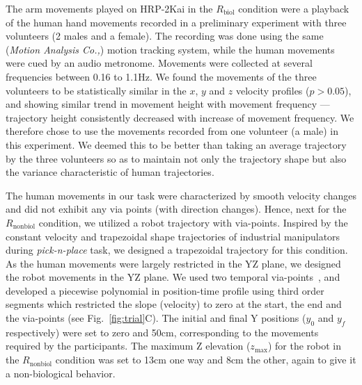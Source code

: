 The arm movements played on HRP-2Kai in the $R_{\text{biol}}$ condition were a playback of the human hand movements recorded in a preliminary experiment with three volunteers (2 males and a female). The recording was done using the same ({\it Motion Analysis Co.,}) motion tracking system, while the human movements were cued by an audio metronome. Movements were collected at several frequencies between 0.16 to 1.1Hz. We found the movements of the three volunteers to be statistically similar in the $x$, $y$ and $z$ velocity profiles ($p > 0.05$), and showing similar trend in movement height with movement frequency ---trajectory height consistently decreased with increase of movement frequency. We therefore chose to use the movements recorded from one volunteer (a male) in this experiment. We deemed this to be better than taking an average trajectory by the three volunteers so as to maintain not only the trajectory shape but also the variance characteristic of human trajectories.                                

The human movements in our task were characterized by smooth velocity changes and did not exhibit any via points (with direction changes). Hence, next for the $R_{\text{nonbiol}}$ condition, we utilized a robot trajectory with via-points. Inspired by the constant velocity and trapezoidal shape trajectories of industrial manipulators during {\it pick-n-place} task, we designed a trapezoidal trajectory for this condition. As the human movements were largely restricted in the YZ plane, we designed the robot movements in the YZ plane. We used two temporal via-points~\cite{Biagiotti:Springer:2008}, and developed a piecewise polynomial in position-time profile using third order segments which restricted the slope (velocity) to zero at the start, the end and the via-points (see Fig.~\ref{fig:trial}C). The initial  and final Y positions ($y_0$ and $y_f$ respectively) were set to zero and 50cm, corresponding to the movements required by the participants. The maximum Z elevation ($z_{\max}$) for the robot in the $R_{\text{nonbiol}}$ condition was set to 13cm one way and 8cm the other, again to give it a non-biological behavior. 




